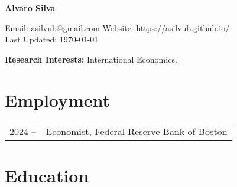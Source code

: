 \documentclass[10pt]{article}
\begin{document}
\begin{center}
\begin{Large} \bfseries Alvaro Silva\end{Large} 
\end{center}


\vspace*{0.2in}
\noindent Email: asilvub@gmail.com \hfill Website: \href{https://asilvub.github.io/}{https://asilvub.github.io/} \\
Last Updated: \today\\

\vspace*{-0.1in}


\noindent \textbf{\normalsize Research Interests: } International Economics.

\section*{Employment}
\begin{tabular}{@{}p{1.8cm}p{13cm}}
    2024 -- & Economist, Federal Reserve Bank of Boston
\end{tabular}

\section*{Education}
%
\end{document}
